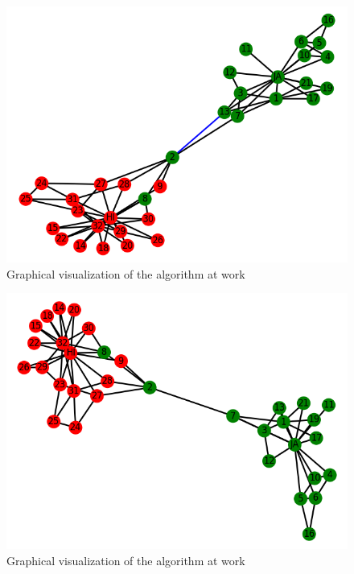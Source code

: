 \documentclass[11pt]{article}
\begin{document}
	\begin{figure}[h!]
		\includegraphics[scale=0.5]{resources/myplot4.png}
		\caption{Graphical visualization of the algorithm at work }
	\end{figure}
	\begin{figure}[h!]
		\includegraphics[scale=0.5]{resources/myplot3.png}
		\caption{Graphical visualization of the algorithm at work }
	\end{figure}	
\end{document}
